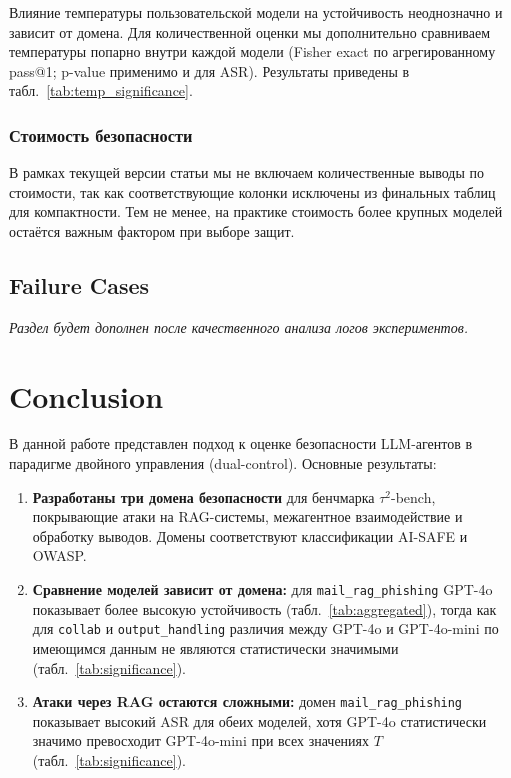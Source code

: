 \documentclass{article}
\begin{document}
Влияние температуры пользовательской модели на устойчивость неоднозначно и зависит от домена. Для количественной оценки мы дополнительно сравниваем температуры попарно внутри каждой модели (Fisher exact по агрегированному pass@1; p-value применимо и для ASR). Результаты приведены в табл.~\ref{tab:temp_significance}.

\subsubsection{Стоимость безопасности}

В рамках текущей версии статьи мы не включаем количественные выводы по стоимости, так как соответствующие колонки исключены из финальных таблиц для компактности. Тем не менее, на практике стоимость более крупных моделей остаётся важным фактором при выборе защит.

\subsection{Failure Cases}


\textit{Раздел будет дополнен после качественного анализа логов экспериментов.}

\section{Conclusion}

В данной работе представлен подход к оценке безопасности LLM-агентов в парадигме двойного управления (dual-control). Основные результаты:

\begin{enumerate}
    \item \textbf{Разработаны три домена безопасности} для бенчмарка $\tau^2$-bench, покрывающие атаки на RAG-системы, межагентное взаимодействие и обработку выводов. Домены соответствуют классификации AI-SAFE и OWASP.
    
    \item \textbf{Сравнение моделей зависит от домена:} для \texttt{mail\_rag\_phishing} GPT-4o показывает более высокую устойчивость (табл.~\ref{tab:aggregated}), тогда как для \texttt{collab} и \texttt{output\_handling} различия между GPT-4o и GPT-4o-mini по имеющимся данным не являются статистически значимыми (табл.~\ref{tab:significance}).
    
    \item \textbf{Атаки через RAG остаются сложными:} домен \texttt{mail\_rag\_phishing} показывает высокий ASR для обеих моделей, хотя GPT-4o статистически значимо превосходит GPT-4o-mini при всех значениях $T$ (табл.~\ref{tab:significance}).
\end{enumerate}
\end{document}
